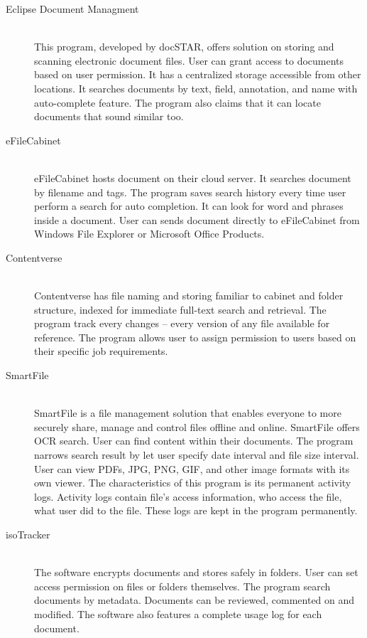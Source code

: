 \begin{description}
\item[Eclipse Document Managment] \hfill \\
This program, developed by docSTAR, offers solution on storing and scanning electronic document files.
User can grant access to documents based on user permission.
It has a centralized storage accessible from other locations.
It searches documents by text, field, annotation, and name with auto-complete feature.
The program also claims that it can locate documents that sound similar too.

\item[eFileCabinet] \hfill \\
eFileCabinet hosts document on their cloud server.
It searches document by filename and tags.
The program saves search history every time user perform a search for auto completion.
It can look for word and phrases inside a document.
User can sends document directly to eFileCabinet from Windows File Explorer or Microsoft Office Products.

\item[Contentverse] \hfill \\
Contentverse has file naming and storing familiar to cabinet and folder structure, indexed for immediate full-text search and retrieval.
The program track every changes -- every version of any file available for reference.
The program allows user to assign permission to users based on their specific job requirements.

\item[SmartFile] \hfill \\
SmartFile is a file management solution that enables everyone to more securely share, manage and control files offline and online.
SmartFile offers \gls{OCR} search.
User can find content within their documents.
The program narrows search result by let user specify date interval and file size interval.
User can view PDFs, JPG, PNG, GIF, and other image formats with its own viewer.
The characteristics of this program is its permanent activity logs.
Activity logs contain file's access information, who access the file, what user did to the file.
These logs are kept in the program permanently.

\item[isoTracker] \hfill \\
The software encrypts documents and stores safely in folders.
User can set access permission on files or folders themselves.
The program search documents by metadata.
Documents can be reviewed, commented on and modified. The software also features a complete usage log for each document.


\end{description}
